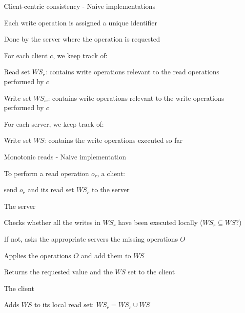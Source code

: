 \begin{frame}{Client-centric consistency - Naive implementations}

\BIL
\item  Each write operation is assigned a unique identifier
\BI
\item Done by the server where the operation is requested
\EI
\item For each client $c$, we keep track of:
  \BI
  \item \alert{Read set $\mathit{WS}_r$}: contains write operations relevant to the read operations performed by $c$
  \item \alert{Write set $\mathit{WS}_w$}: contains write operations relevant to the write operations performed by $c$
  \EI
\item For each server, we keep track of:
  \BI
	\item \alert{Write set $\mathit{WS}$}: contains the write operations executed so far
  \EI
\EIL

\end{frame}

\begin{frame}{Monotonic reads - Naive implementation}

\BIL
\item To perform a read operation $o_r$, a client:
	\BI
	\item send $o_r$ and its read set $\mathit{WS}_r$ to the server
	\EI
\item The server
\BI
\item Checks whether all the writes in $\mathit{WS}_r$ have been executed locally ($\mathit{WS}_r \subseteq \mathit{WS}$?)
\item If not, asks the appropriate servers the missing operations $O$
\item Applies the operations $O$ and add them to $\mathit{WS}$
\item Returns the requested value and the $\mathit{WS}$ set to the client
\EI
\item The client
\BI
\item Adds $\mathit{WS}$ to its local read set: $\mathit{WS}_r = \mathit{WS}_r \cup \mathit{WS}$
\EI
\EIL

\end{frame}

